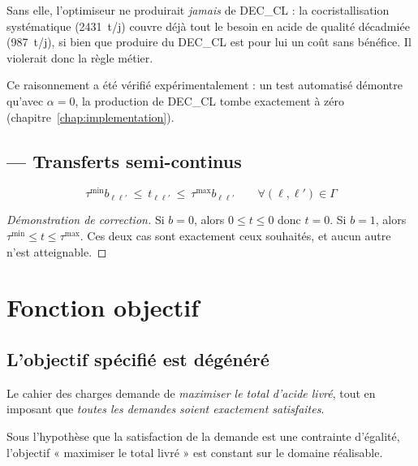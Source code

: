 \begin{encadre}[title={Pourquoi cette contrainte est indispensable}]
Sans elle, l'optimiseur ne produirait \emph{jamais} de DEC\_CL : la cocristallisation
systématique (\SI{2431}{\tonne}/j) couvre déjà tout le besoin en acide de qualité décadmiée
(\SI{987}{\tonne}/j), si bien que produire du DEC\_CL est pour lui un coût sans bénéfice.
Il violerait donc la règle métier.

Ce raisonnement a été vérifié expérimentalement : un test automatisé démontre qu'avec
$\alpha = 0$, la production de DEC\_CL tombe exactement à zéro
(chapitre~\ref{chap:implementation}).
\end{encadre}

\subsection{ --- Transferts semi-continus}

\begin{equation}
\tau^{\min} b_{\ell\ell'} \ \le\ t_{\ell\ell'} \ \le\ \tau^{\max} b_{\ell\ell'}
\qquad \forall (\ell,\ell') \in \Gamma
\label{eq:C16}
\end{equation}

\begin{proof}[Démonstration de correction]
Si $b = 0$, alors $0 \le t \le 0$ donc $t = 0$. Si $b = 1$, alors
$\tau^{\min} \le t \le \tau^{\max}$. Ces deux cas sont exactement ceux souhaités, et aucun
autre n'est atteignable.
\end{proof}

\section{Fonction objectif}

\subsection{L'objectif spécifié est dégénéré}
\label{sec:degenerescence}

Le cahier des charges demande de \emph{maximiser le total d'acide livré}, tout en imposant
que \emph{toutes les demandes soient exactement satisfaites}.

\begin{proposition}[Dégénérescence]
Sous l'hypothèse que la satisfaction de la demande est une contrainte d'égalité, l'objectif
« maximiser le total livré » est constant sur le domaine réalisable.
\end{proposition}

